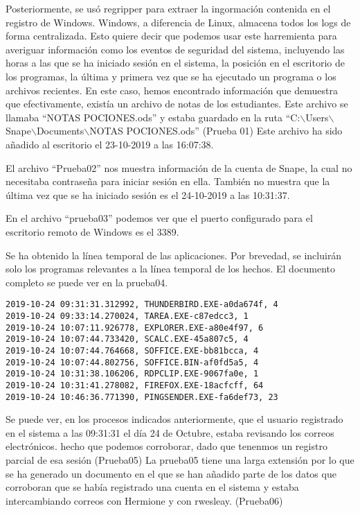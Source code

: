 Posteriormente, se usó regripper \cite{regripper} para extraer la ingormación contenida en el registro de Windows. 
Windows, a diferencia de Linux, almacena todos los logs de forma centralizada.
Esto quiere decir que podemos usar este harremienta para averiguar información como los eventos de seguridad del sistema, incluyendo las horas a las que se ha iniciado sesión en el sistema, la posición en el escritorio de los programas, la última y primera vez que se ha ejecutado un programa o los archivos recientes.
En este caso, hemos encontrado información que demuestra que efectivamente, existía un archivo de notas de los estudiantes. Este archivo se llamaba ``NOTAS POCIONES.ods'' y estaba guardado en la ruta ``C:$\backslash$Users$\backslash$Snape$\backslash$Documents$\backslash$NOTAS POCIONES.ods'' (Prueba 01)
Este archivo ha sido añadido al escritorio el 23-10-2019 a las 16:07:38.


El archivo ``Prueba02'' nos muestra información de la cuenta de Snape, la cual no necesitaba contraseña para iniciar sesión en ella. También no muestra que la última vez que se ha iniciado sesión es el 24-10-2019 a las 10:31:37.

En el archivo ``prueba03'' podemos ver que el puerto configurado para el escritorio remoto de Windows es el 3389.

Se ha obtenido la línea temporal de las aplicaciones. Por brevedad, se incluirán solo los programas relevantes a la línea temporal de los hechos. El documento completo se puede ver en la prueba04.

\begin{lstlisting}
2019-10-24 09:31:31.312992, THUNDERBIRD.EXE-a0da674f, 4
2019-10-24 09:33:14.270024, TAREA.EXE-c87edcc3, 1
2019-10-24 10:07:11.926778, EXPLORER.EXE-a80e4f97, 6
2019-10-24 10:07:44.733420, SCALC.EXE-45a807c5, 4
2019-10-24 10:07:44.764668, SOFFICE.EXE-bb81bcca, 4
2019-10-24 10:07:44.802756, SOFFICE.BIN-af0fd5a5, 4
2019-10-24 10:31:38.106206, RDPCLIP.EXE-9067fa0e, 1
2019-10-24 10:31:41.278082, FIREFOX.EXE-18acfcff, 64
2019-10-24 10:46:36.771390, PINGSENDER.EXE-fa6def73, 23
\end{lstlisting}

Se puede ver, en los procesos indicados anteriormente, que el usuario registrado en el sistema a las 09:31:31 el día 24 de Octubre, estaba revisando los correos electrónicos.
hecho que podemos corroborar, dado que tenenmos un registro parcial de esa sesión (Prueba05)
La prueba05 tiene una larga extensión por lo que se ha generado un documento en el que se han añadido parte de los datos que corroboran que se había registrado una cuenta en el sistema y estaba intercambiando correos con Hermione y con rwesleay. (Prueba06)

